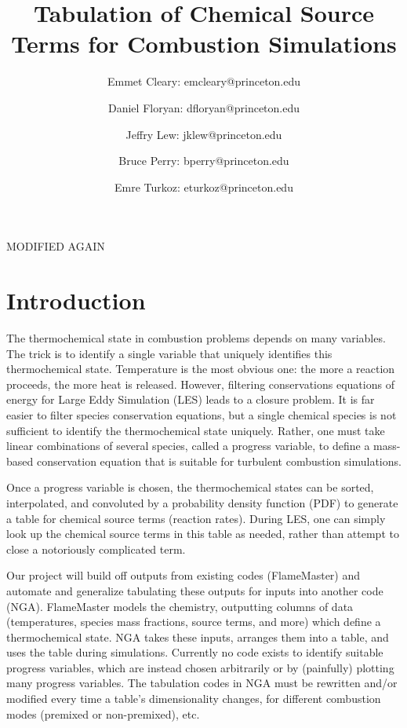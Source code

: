 \documentclass[11pt]{article}
\begin{document}
\title{\textbf{Tabulation of Chemical Source Terms for Combustion Simulations}}
\author{Emmet Cleary: emcleary@princeton.edu \and Daniel Floryan: dfloryan@princeton.edu \and Jeffry Lew: jklew@princeton.edu \and Bruce Perry: bperry@princeton.edu \and Emre Turkoz: eturkoz@princeton.edu}
\date{ } 
\maketitle

MODIFIED AGAIN
\section{Introduction}

The thermochemical state in combustion problems depends on many variables. The trick is to identify a single variable that uniquely identifies this thermochemical state. Temperature is the most obvious one: the more a reaction proceeds, the more heat is released. However, filtering conservations equations of energy for Large Eddy Simulation (LES) leads to a closure problem. It is far easier to filter species conservation equations, but a single chemical species is not sufficient to identify the thermochemical state uniquely. Rather, one must take linear combinations of several species, called a progress variable, to define a mass-based conservation equation that is suitable for turbulent combustion simulations.

Once a progress variable is chosen, the thermochemical states can be sorted, interpolated, and convoluted by a probability density function (PDF) to generate a table for chemical source terms (reaction rates). During LES, one can simply look up the chemical source terms in this table as needed, rather than attempt to close a notoriously complicated term.

Our project will build off outputs from existing codes (FlameMaster) and automate and generalize tabulating these outputs for inputs into another code (NGA). FlameMaster models the chemistry, outputting columns of data (temperatures, species mass fractions, source terms, and more) which define a thermochemical state. NGA takes these inputs, arranges them into a table, and uses the table during simulations. Currently no code exists to identify suitable progress variables, which are instead chosen arbitrarily or by (painfully) plotting many progress variables. The tabulation codes in NGA must be rewritten and/or modified every time a table's dimensionality changes, for different combustion modes (premixed or non-premixed), etc.
\end{document}

